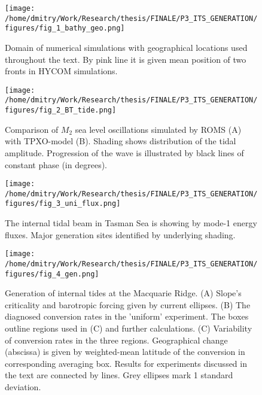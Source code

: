 \documentclass[12pt]{article}
\newcommand{\SCALEO}{2}
\newcommand{\SCALET}{1.5}
\begin{document}
\begin{figure}
	\centering
	\texttt{[image: /home/dmitry/Work/Research/thesis/FINALE/P3\_ITS\_GENERATION/figures/fig\_1\_bathy\_geo.png]}
	\caption{Domain of numerical simulations with geographical locations used throughout the text. 
	By pink line it is given mean position of two fronts in HYCOM simulations.}
	\label{C3:fig:geo.map}
\end{figure}

\begin{figure}
	\centering
	\texttt{[image: /home/dmitry/Work/Research/thesis/FINALE/P3\_ITS\_GENERATION/figures/fig\_2\_BT\_tide.png]}
	\caption{Comparison of $M_2$ sea level oscillations simulated by ROMS (A) with 
	TPXO-model (B). Shading shows distribution of the tidal amplitude. Progression of the wave is 
	illustrated by black lines of constant phase (in degrees).}
	\label{C3.fig:BT}
\end{figure}

\begin{figure}
	\centering
	\texttt{[image: /home/dmitry/Work/Research/thesis/FINALE/P3\_ITS\_GENERATION/figures/fig\_3\_uni\_flux.png]}
	\caption{The internal tidal beam in Tasman Sea is showing by mode-1 energy fluxes. Major 
	generation sites identified by underlying shading.}
	\label{C3.fig:beam}
\end{figure}

\begin{figure}
	\centering
	\texttt{[image: /home/dmitry/Work/Research/thesis/FINALE/P3\_ITS\_GENERATION/figures/fig\_4\_gen.png]}
	\caption{Generation of internal tides at the Macquarie Ridge. (A) Slope's criticality and 
	barotropic forcing given by current ellipses. (B) The diagnosed conversion rates in the 
	'uniform' experiment. The boxes outline regions used in (C) and further calculations. (C) 
	Variability of conversion rates in the three regions. Geographical change (abscissa) is given 
	by weighted-mean latitude of the conversion in corresponding averaging box. Results for 
	experiments discussed in the text are connected by lines. Grey ellipses mark 1 standard 
	deviation.}
	\label{C3.fig:gen}
\end{figure}
\end{document}
